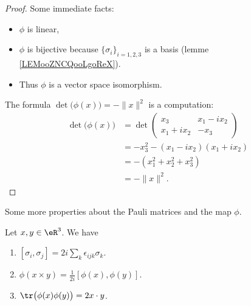 \begin{proof}
	Some immediate facts:
	\begin{itemize}
		\item \( \phi\) is linear,
		\item \( \phi\) is bijective because \( \{ \sigma_i \}_{i=1,2,3}\) is a basis (lemme \ref{LEMooZNCQooLgoReX}).
		\item Thus \( \phi\) is a vector space isomorphism.
	\end{itemize}
	The formula \( \det\big( \phi(x) \big)=-\| x \|^2\) is a computation:
	\begin{subequations}
		\begin{align}
			\det\big( \phi(x) \big) & =\det\begin{pmatrix}
				                               x_3      & x_1-ix_2 \\
				                               x_1+ix_2 & -x_3
			                               \end{pmatrix}     \\
			                        & =-x_3^2-(x_1-ix_2)(x_1+ix_2) \\
			                        & =-(x_1^2+x_2^2+x_3^2)        \\
			                        & =-\| x \|^2.
		\end{align}
	\end{subequations}
\end{proof}

Some more properties about the Pauli matrices and the map \( \phi\).
\begin{proposition}
	Let \( x,y\in \eR^3\). We have
	\begin{enumerate}
		\item       \label{ITEMooDDRNooGZASBN}
		      $[\sigma_i,\sigma_j]=2i\sum_k\epsilon_{ijk}\sigma_k$.
		\item       \label{ITEMooXORKooXFwQhR}
		      $\phi(x\times y)=\frac{1}{ 2i }[\phi(x),\phi(y)]$.
		\item       \label{ITEMooREMBooLPVnxz}
		      \( \tr\big( \phi(x)\phi(y) \big)=2x\cdot y\).
	\end{enumerate}
\end{proposition}

